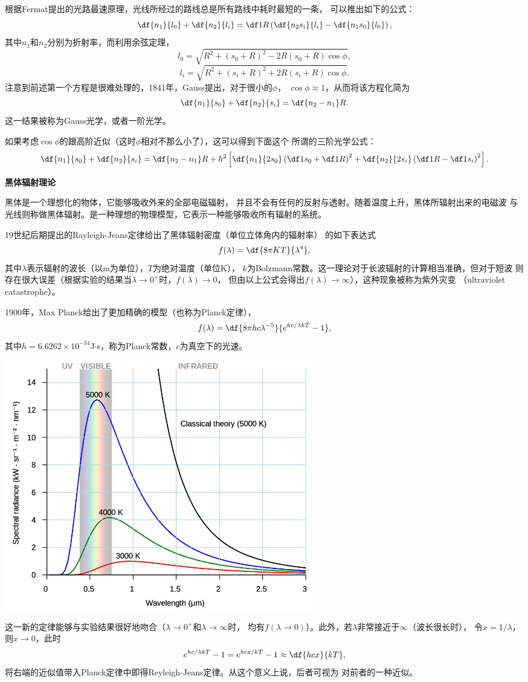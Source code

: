 \begin{shaded}
	根据Fermat提出的{\kaishu 光路最速原理}，光线所经过的路线总是所有路线中耗时最短的一条，
	可以推出如下的公式：
	$$\df{n_1}{l_0}+\df{n_2}{l_i}=\df1R\left(\df{n_2s_i}{l_i}
	-\df{n_1s_0}{l_0}\right),$$
	其中$n_1$和$n_2$分别为折射率，而利用余弦定理，
	$$l_0=\sqrt{R^2+(s_0+R)^2-2R(s_0+R)\cos\phi},$$
	$$l_i=\sqrt{R^2+(s_i+R)^2+2R(s_i+R)\cos\phi}.$$
	注意到前述第一个方程是很难处理的，1841年，Gauss提出，对于很小的$\phi$，
	$\cos\phi\approx 1$，从而将该方程化简为
	$$\df{n_1}{s_0}+\df{n_2}{s_i}=\df{n_2-n_1}R.$$
	这一结果被称为{\kaishu Gauss光学}，或者{\kaishu 一阶光学}。
	
	如果考虑$\cos\phi$的跟高阶近似（这时$\phi$相对不那么小了），这可以得到下面这个
	所谓的{\kaishu 三阶光学}公式：
	$$\df{n_1}{s_0}+\df{n_2}{s_i}=\df{n_2-n_1}R
	+h^2\left[\df{n_1}{2s_0}\left(\df1{s_0}+\df1R\right)^2
	+\df{n_2}{2s_i}\left(\df1R-\df1{s_i}\right)^2\right].$$
	
	{\bf 黑体辐射理论}
	
	{\kaishu 黑体}是一个理想化的物体，它能够吸收外来的全部电磁辐射，
	并且不会有任何的反射与透射。随着温度上升，黑体所辐射出来的电磁波
	与光线则称做黑体辐射。是一种理想的物理模型，它表示一种能够吸收所有辐射的系统。
	
	19世纪后期提出的Rayleigh-Jeans定律给出了黑体辐射密度（单位立体角内的辐射率）
	的如下表达式
	$$f(\lambda)=\df{8\pi KT}{\lambda^4},$$
	其中$\lambda$表示辐射的波长（以m为单位），$T$为绝对温度（单位K），
	$k$为Bolzmann常数。这一理论对于长波辐射的计算相当准确，但对于短波
	则存在很大误差（根据实验的结果当$\lambda\to0^+$时，$f(\lambda)\to0$，
	但由以上公式会得出$f(\lambda)\to\infty$），这种现象被称为{\kaishu 紫外灾变}
	（ultraviolet catastrophe）。
	
	1900年，Max Planck给出了更加精确的模型（也称为{\kaishu Planck定律}），
	$$f(\lambda)=\df{8\pi h c\lambda^{-5}}{e^{hc/{\lambda kT}}-1},$$
	其中$h=6.6262\times 10^{-34}$J$\cdot$s，称为Planck常数，$c$为真空下的光速。
	
	\begin{center}
		\includegraphics[width=0.6\textwidth]{./images/ch12/blackBody.jpg}
	\end{center}
	
	这一新的定律能够与实验结果很好地吻合（$\lambda\to0^+$和$\lambda\to\infty$时，
	均有$f(\lambda\to0)$）。此外，若$\lambda$非常接近于$\infty$（波长很长时），
	令$x=1/\lambda$，则$x\to 0$，此时
	$$e^{hc/{\lambda kT}}-1=e^{hcx/{kT}}-1\approx\df{hcx}{kT},$$
	将右端的近似值带入Planck定律中即得Reyleigh-Jeans定律。从这个意义上说，后者可视为
	对前者的一种近似。
\end{shaded}

